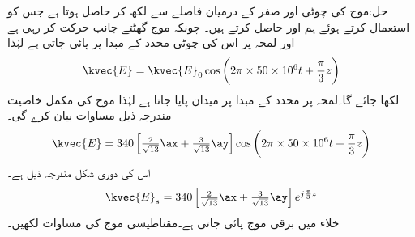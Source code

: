 حل:موج کی چوٹی اور صفر کے درمیان فاصلے سے  لکھ کر  حاصل ہوتا ہے جس کو استعمال کرتے ہوئے ہم    اور  حاصل کرتے  ہیں۔ چونکہ موج گھٹتے  جانب حرکت کر رہی ہے اور لمحہ  پر اس کی چوٹی محدد کے مبدا پر پائی جاتی ہے  لہٰذا 
\begin{align*}
\kvec{E}=\kvec{E}_0 \cos \left(2\pi \times 50 \times 10^6 t + \frac{\pi}{3} z \right)
\end{align*}
لکھا جائے گا۔لمحہ  پر محدد کے مبدا پر میدان  پایا جاتا ہے لہٰذا موج کی مکمل خاصیت مندرجہ ذیل مساوات بیان کرے گی۔ 
\begin{align*}
\kvec{E}=340\left[\tfrac{2}{\sqrt{13}}\ax+\tfrac{3}{\sqrt{13}}\ay\right] \cos \left(2\pi \times 50 \times 10^6 t + \frac{\pi}{3} z \right)
\end{align*}
اس کی دوری شکل مندرجہ ذیل ہے۔
\begin{align*}
\kvec{E}_s=340\left[\tfrac{2}{\sqrt{13}}\ax+\tfrac{3}{\sqrt{13}}\ay\right] e^{j\frac{\pi}{3} z}
\end{align*}
خلاء میں برقی موج  پائی جاتی ہے۔مقناطیسی موج کی مساوات لکھیں۔

